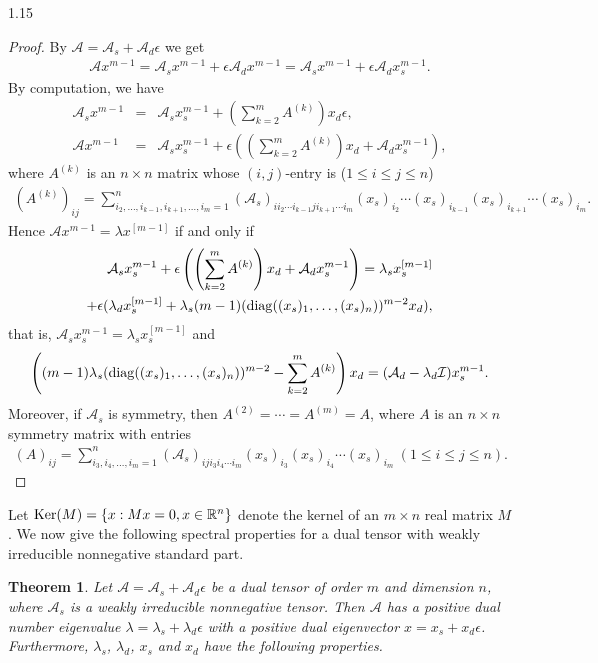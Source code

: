 \documentclass[preprint,12pt]{elsarticle}
\newtheorem{thm}{Theorem}[section]
\begin{document}
\begin{spacing}{1.15}
\begin{proof}
By $\mathcal{A}=\mathcal{A}_s+\mathcal{A}_d\epsilon$ we get
\begin{eqnarray*}
\mathcal{A}x^{m-1}=\mathcal{A}_sx^{m-1}+\epsilon\mathcal{A}_dx^{m-1}=\mathcal{A}_sx^{m-1}+\epsilon\mathcal{A}_dx_s^{m-1}.
\end{eqnarray*}
By computation, we have
\begin{eqnarray*}
\mathcal{A}_sx^{m-1}&=&\mathcal{A}_sx_s^{m-1}+\left(\sum_{k=2}^mA^{(k)}\right)x_d\epsilon,\\
\mathcal{A}x^{m-1}&=&\mathcal{A}_sx_s^{m-1}+\epsilon\left(\left(\sum_{k=2}^mA^{(k)}\right)x_d+\mathcal{A}_dx_s^{m-1}\right),
\end{eqnarray*}
where $A^{(k)}$ is an $n\times n$ matrix whose $(i,j)$-entry is ($1\leq i\leq j\leq n$)
\begin{eqnarray*}
(A^{(k)})_{ij}=\sum_{i_2,\ldots,i_{k-1},i_{k+1},\ldots,i_m=1}^n(\mathcal{A}_s)_{ii_2\cdots i_{k-1}ji_{k+1}\cdots i_m}(x_s)_{i_2}\cdots (x_s)_{i_{k-1}}(x_s)_{i_{k+1}}\cdots(x_s)_{i_m}.
\end{eqnarray*}
Hence $\mathcal{A}x^{m-1}=\lambda x^{[m-1]}$ if and only if
\begin{eqnarray*}
\mathcal{A}_sx_s^{m-1}+\epsilon\left(\left(\sum_{k=2}^mA^{(k)}\right)x_d+\mathcal{A}_dx_s^{m-1}\right)=\lambda_sx_s^{[m-1]}\\
+\epsilon(\lambda_dx_s^{[m-1]}+\lambda_s(m-1)({\rm diag}((x_s)_1,\ldots,(x_s)_n))^{m-2}x_d),
\end{eqnarray*}
that is, $\mathcal{A}_sx_s^{m-1}=\lambda_sx_s^{[m-1]}$ and
\begin{eqnarray*}
\left((m-1)\lambda_s({\rm diag}((x_s)_1,\ldots,(x_s)_n))^{m-2}-\sum_{k=2}^mA^{(k)}\right)x_d=(\mathcal{A}_d-\lambda_d\mathcal{I})x_s^{m-1}.
\end{eqnarray*}
Moreover, if $\mathcal{A}_s$ is symmetry, then $A^{(2)}=\cdots=A^{(m)}=A$, where $A$ is an $n\times n$ symmetry matrix with entries
\begin{eqnarray*}
(A)_{ij}=\sum_{i_3,i_4,\ldots,i_m=1}^n(\mathcal{A}_s)_{iji_3i_4\cdots i_m}(x_s)_{i_3}(x_s)_{i_4}\cdots(x_s)_{i_m}~(1\leq i\leq j\leq n).
\end{eqnarray*}
\end{proof}
Let ${\rm Ker}(M)=\{x:Mx=0,x\in\mathbb{R}^n\}$ denote the kernel of an $m\times n$ real matrix $M$. We now give the following spectral properties for a dual tensor with weakly irreducible nonnegative standard part.
\begin{thm}
Let $\mathcal{A}=\mathcal{A}_s+\mathcal{A}_d\epsilon$ be a dual tensor of order $m$ and dimension $n$, where $\mathcal{A}_s$ is a weakly irreducible nonnegative tensor. Then $\mathcal{A}$ has a positive dual number eigenvalue $\lambda=\lambda_s+\lambda_d\epsilon$ with a positive dual eigenvector $x=x_s+x_d\epsilon$. Furthermore, $\lambda_s$, $\lambda_d$, $x_s$ and $x_d$ have the following properties.\\

\end{thm}
\end{spacing}
\end{document}
